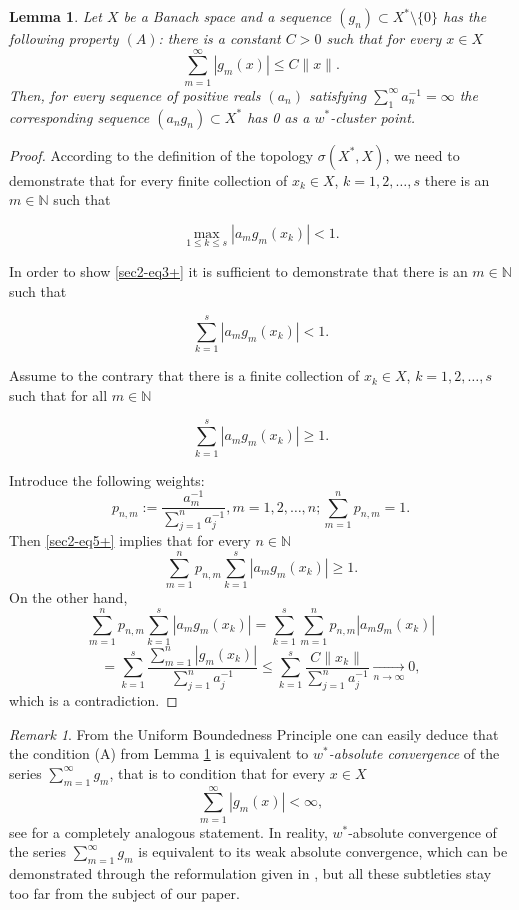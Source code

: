 \documentclass[11pt,twoside, reqno]{amsart}
\newcommand{\N}{{\mathbb N}}
\theoremstyle{plain}
\newtheorem{lemma}[theorem]{Lemma}
\theoremstyle{remark}
\newtheorem{remark}[theorem]{Remark}
\theoremstyle{definition}
\numberwithin{equation}{section}
\begin{document}
\begin{lemma}  \label{lem1}
Let $X$ be a Banach space and a sequence $(g_n) \subset X^*\setminus \{0\}$ has the following property $(A)$:  there is a constant $C>0$ such that for every $x \in X$
$$
\sum_{m=1}^\infty \left|g_m(x) \right| \le C \|x\|.
$$
Then, for every sequence of positive reals $(a_n)$ satisfying $\sum_1^\infty a_n^{-1}=\infty$ the corresponding sequence  $(a_n g_n) \subset X^*$ has 0 as a $w^*$-cluster point.
\end{lemma}
\begin{proof}

According to the definition of the topology $\sigma(X^*, X)$, we need to demonstrate that for every finite collection of  $x_k \in X$, $k=1, 2,\ldots,s$ there is an $m \in \N$ such that

\begin{equation} \label{sec2-eq3+}
\max_{1\le k \le s} \left| a_m g_m(x_k)  \right| <1. 
\end{equation}

In order to show \eqref{sec2-eq3+} it is sufficient to demonstrate that   
there is an $m \in \N$ such that


\begin{equation*} \label{sec2-eq4+}
\sum_{ k = 1}^s \left|  a_m g_m(x_k) \right| <1. 
\end{equation*}

Assume to the contrary that there is a finite collection of  $x_k \in X$, $k=1, 2,\ldots,s$ such that for all $m \in \N$

\begin{equation} \label{sec2-eq5+}
\sum_{ k = 1}^s \left|  a_m g_m(x_k) \right| \ge 1. 
\end{equation}

Introduce the following weights:
$$
p_{n,m}:=\frac{a_m^{-1}}{\sum_{j=1}^n a_j^{-1}}, m=1,2, \ldots, n; \sum_{m=1}^n p_{n,m} =1.
$$
Then \eqref{sec2-eq5+} implies that for every $n \in \N$
$$
\sum_{m=1}^n p_{n,m} \sum_{ k = 1}^s \left|  a_m g_m(x_k) \right| \ge 1. 
$$
On the other hand,
$$
\sum_{m=1}^n p_{n,m} \sum_{ k = 1}^s \left|  a_m g_m(x_k) \right| =  \sum_{ k = 1}^s\sum_{m=1}^n p_{n,m} \left|  a_m g_m(x_k) \right|  
$$
$$
=  \sum_{ k = 1}^s\frac{\sum_{m=1}^n
\left| g_m(x_k) \right|}{\sum_{j=1}^n a_j^{-1}} \le  \sum_{ k = 1}^s\frac{C\|x_k\|}{\sum_{j=1}^n a_j^{-1}} \xrightarrow[ n \to \infty]{} 0,
$$
which is a contradiction.
\end{proof}

\begin{remark} \label{remarkrem}
From the Uniform Boundedness Principle one can easily deduce that the condition (A) from  Lemma \ref{lem1} is equivalent to  \emph{$w^*$-absolute convergence} of the series $\sum_{m=1}^\infty g_m$, that is to condition that for every $x \in X$
$$
\sum_{m=1}^\infty \left|g_m(x) \right|< \infty,
$$
see \cite[Lemma 6.4.1]{kadkad} for a completely analogous statement. In reality, $w^*$-absolute convergence of the series $\sum_{m=1}^\infty g_m$ is equivalent to its weak absolute convergence, which can be demonstrated through the reformulation given in \cite[Exercise 6.4.1]{kadkad}, but all these subtleties stay too far from the subject of our paper.
\end{remark}
\end{document}

